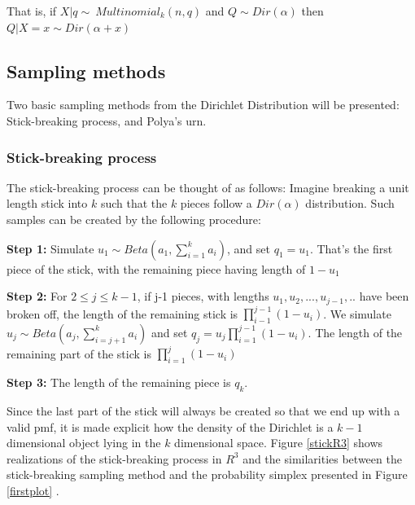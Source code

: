 \documentclass [twoside,hidelinks]{article}
\begin{document}
That is,  if $ X|q \sim\ Multinomial_k (n,q) $ and $ Q \sim Dir ( \alpha ) $ then $ Q| X=x \sim Dir ( \alpha + x) $

\subsection{Sampling methods}

Two basic sampling methods from the Dirichlet Distribution will be presented: Stick-breaking process, and Polya's urn.

\subsubsection{Stick-breaking process}

The stick-breaking process can be thought of as follows: Imagine breaking a unit length stick into $k$ such that the $k$ pieces follow a $Dir ( \alpha)$  distribution. Such samples can be created by the following procedure:
\begin{compactitem}
	\item  \textbf{Step 1:} Simulate $ u_1 \sim Beta (a_1, \sum_{i=1}^k a_i ) $, and set $q_1 = u_1$. That's the first piece of the stick, with the remaining piece having length of $ 1-u_1$
	\item \textbf{Step 2:} For $ 2 \leq j \leq k-1$, if j-1 pieces, with lengths  $u_1,u_2,...,u_{j-1},..$ have been broken off, the length of the remaining stick is $\prod_{i-1}^{j-1}  (1 - u_i) $. We simulate $ u_j \sim Beta ( a_j, \sum_{i=j+1}^k a_i) $ and set  $q_j=u_j \prod_{i=1}^{j-1} (1-u_i)$. The length of the remaining part of the stick is  $\prod_{i=1}^{j} (1-u_i)$
	\item  \textbf{Step 3:} The length of the remaining piece is $q_k$.


\end{compactitem}
Since the last part of the stick will always be created so that we end up with a valid pmf, it is made explicit how the density of the Dirichlet is  a ${k-1}$ dimensional object lying in the $k$ dimensional space. Figure \ref{stickR3} shows realizations of the stick-breaking process in $R^3$ and the similarities between the stick-breaking sampling method and the probability simplex presented in Figure \ref{firstplot} .
\end{document}
